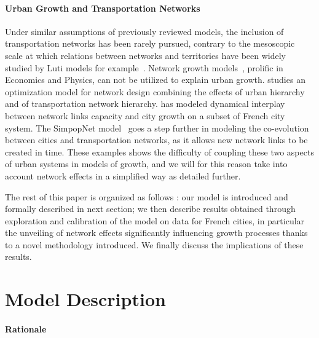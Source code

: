 \documentclass[Royal,sageh,times]{sagej}
\begin{document}


\paragraph{Urban Growth and Transportation Networks}


Under similar assumptions of previously reviewed models, the inclusion of transportation networks has been rarely pursued, contrary to the mesoscopic scale at which relations between networks and territories have been widely studied by Luti models for example~\citep{chang2006models}. Network growth models~\citep{xie2009modeling}, prolific in Economics and Physics, can not be utilized to explain urban growth. \cite{bigotte2010integrated} studies an optimization model for network design combining the effects of urban hierarchy and of transportation network hierarchy. \cite{baptiste1999interactions} has modeled dynamical interplay between network links capacity and city growth on a subset of French city system. The SimpopNet model~\citep{schmitt2014modelisation} goes a step further in modeling the co-evolution between cities and transportation networks, as it allows new network links to be created in time. These examples shows the difficulty of coupling these two aspects of urban systems in models of growth, and we will for this reason take into account network effects in a simplified way as detailed further.


The rest of this paper is organized as follows : our model is introduced and formally described in next section; we then describe results obtained through exploration and calibration of the model on data for French cities, in particular the unveiling of network effects significantly influencing growth processes thanks to a novel methodology introduced. We finally discuss the implications of these results.





\section*{Model Description}




\paragraph{Rationale}
\end{document}

